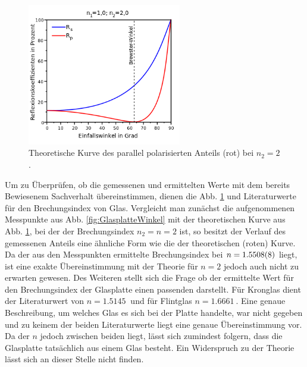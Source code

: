 		\begin{figure}[ht]
			\centering
			\includegraphics[width=0.6\textwidth]{bilder/wikiBrewster.png}
			\caption{Theoretische Kurve des parallel polarisierten Anteils (rot) bei $n_2 = 2$. \cite{wikiBrewster}}
			\label{fig:wiki_brewster}	
		\end{figure}
		Um zu Überprüfen, ob die gemessenen und ermittelten Werte mit dem bereits Bewiesenem Sachverhalt übereinstimmen, dienen die Abb. \ref{fig:wiki_brewster} und Literaturwerte für den Brechungsindex von Glas.
		Vergleicht man zunächst die aufgenommenen Messpunkte aus Abb. \ref{fig:GlasplatteWinkel} mit der theoretischen Kurve aus Abb. \ref{fig:wiki_brewster}, bei der der Brechungsindex $n_2 = n = 2$ ist, so besitzt der Verlauf des gemessenen Anteils eine ähnliche Form wie die der theoretischen (roten) Kurve.
		Da der aus den Messpunkten ermittelte Brechungsindex bei $n = \SI{1,5508+-0,0008}{}$ liegt, ist eine exakte Übereinstimmung mit der Theorie für $n=2$ jedoch auch nicht zu erwarten gewesen.
		Des Weiteren stellt sich die Frage ob der ermittelte Wert für den Brechungsindex der Glasplatte  einen passenden darstellt.
		Für Kronglas dient der Literaturwert\cite{Refrac} von $n = \SI{1.5145}{}$ und für Flintglas $n = \SI{1.6661}{}$.
		Eine genaue Beschreibung, um welches Glas es sich bei der Platte handelte, war nicht gegeben und zu keinem der beiden Literaturwerte liegt eine genaue Übereinstimmung vor.
		Da der $n$ jedoch zwischen beiden liegt, lässt sich zumindest folgern, dass die Glasplatte tatsächlich aus einem Glas besteht.
		Ein Widerspruch zu der Theorie lässt sich an dieser Stelle nicht finden.
		
		
